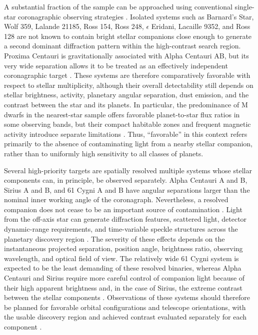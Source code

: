 A substantial fraction of the sample can be approached using conventional single-star coronagraphic observing strategies \cite{Guyon2006}. 
Isolated systems such as Barnard's Star, Wolf 359, Lalande 21185, Ross 154, Ross 248, $\epsilon$ Eridani, Lacaille 9352, and Ross 128 are not known to contain bright stellar companions close enough to generate a second dominant diffraction pattern within the high-contrast search region. Proxima Centauri is gravitationally associated with Alpha Centauri AB, but its very wide separation allows it to be treated as an effectively independent coronagraphic target \cite{Beichman2020}. 
These systems are therefore comparatively favorable with respect to stellar multiplicity, although their overall detectability still depends on stellar brightness, activity, planetary angular separation, dust emission, and the contrast between the star and its planets. In particular, the predominance of M dwarfs in the
nearest-star sample offers favorable planet-to-star flux ratios in some observing bands, but their compact habitable zones and frequent magnetic activity introduce separate limitations \cite{Shields2016}. 
Thus, “favorable” in this context refers primarily to the absence of contaminating light from a nearby stellar companion, rather than to uniformly high sensitivity to all classes of planets.

Several high-priority targets are spatially resolved multiple systems whose stellar components can, in principle, be observed separately. Alpha Centauri A and B, Sirius A and B, and 61 Cygni A and B have angular separations larger than the nominal inner working angle of the coronagraph. Nevertheless, a resolved companion does not cease to be an important source of contamination \cite{Guyon2006}. 
Light from the off-axis star can generate diffraction features, scattered light, detector dynamic-range requirements, and time-variable speckle structures across the planetary discovery region \cite{Sirbu2017}. 
The severity of these effects depends on the instantaneous projected separation, position angle, brightness ratio, observing wavelength, and optical field of view. The relatively wide 61 Cygni system is expected to be the least demanding of these resolved binaries, whereas Alpha Centauri and Sirius require more careful control of companion light because of their high apparent brightness and, in the case of Sirius, the extreme contrast between the stellar components \cite{Beichman2020}. 
Observations of these systems should therefore be planned for favorable orbital configurations and telescope orientations, with the usable discovery region and achieved contrast evaluated separately for each component \cite{LUVOIR2019}.

